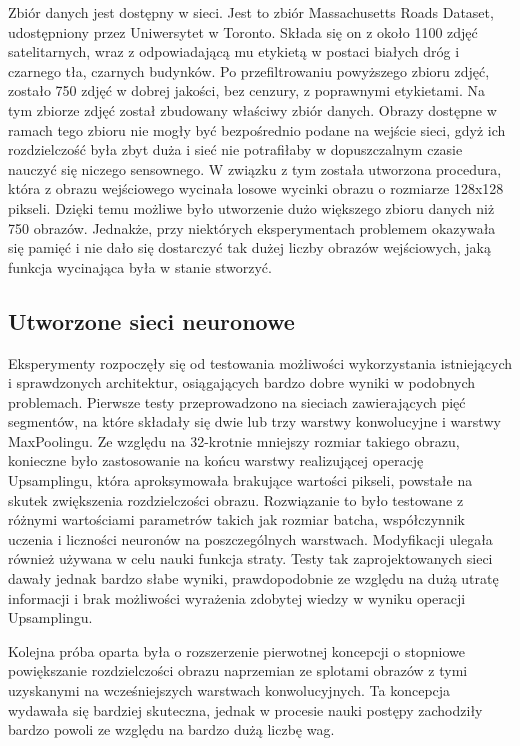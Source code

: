 \documentclass{article}
\begin{document}
Zbiór danych jest dostępny w sieci. Jest to zbiór Massachusetts Roads Dataset, udostępniony przez Uniwersytet w Toronto. Składa się on z około 1100 zdjęć satelitarnych, wraz z odpowiadającą mu etykietą w postaci białych dróg i czarnego tła, czarnych budynków. Po przefiltrowaniu powyższego zbioru zdjęć, zostało 750 zdjęć w dobrej jakości, bez cenzury, z poprawnymi etykietami. Na tym zbiorze zdjęć został zbudowany właściwy zbiór danych. Obrazy dostępne w ramach tego zbioru nie mogły być bezpośrednio podane na wejście sieci, gdyż ich rozdzielczość była zbyt duża i sieć nie potrafiłaby w dopuszczalnym czasie nauczyć się niczego sensownego. W związku z tym została utworzona procedura, która z obrazu wejściowego wycinała losowe wycinki obrazu o rozmiarze 128x128 pikseli. Dzięki temu możliwe było utworzenie dużo większego zbioru danych niż 750 obrazów. Jednakże, przy niektórych eksperymentach problemem okazywała się pamięć i nie dało się dostarczyć tak dużej liczby obrazów wejściowych, jaką funkcja wycinająca była w stanie stworzyć.

\subsection{Utworzone sieci neuronowe}

Eksperymenty rozpoczęły się od testowania możliwości wykorzystania istniejących i sprawdzonych architektur, osiągających bardzo dobre wyniki w podobnych problemach. Pierwsze testy przeprowadzono na sieciach zawierających pięć segmentów, na które składały się dwie lub trzy warstwy konwolucyjne i warstwy MaxPoolingu. Ze względu na 32-krotnie mniejszy rozmiar takiego obrazu, konieczne było zastosowanie na końcu warstwy realizującej operację Upsamplingu, która aproksymowała brakujące wartości pikseli, powstałe na skutek zwiększenia rozdzielczości obrazu. Rozwiązanie to było testowane z różnymi wartościami parametrów takich jak rozmiar batcha, współczynnik uczenia i liczności neuronów na poszczególnych warstwach. Modyfikacji ulegała również używana w celu nauki funkcja straty. Testy tak zaprojektowanych sieci dawały jednak bardzo słabe wyniki, prawdopodobnie ze względu na dużą utratę informacji i brak możliwości wyrażenia zdobytej wiedzy w wyniku operacji Upsamplingu.

Kolejna próba oparta była o rozszerzenie pierwotnej koncepcji o stopniowe powiększanie rozdzielczości obrazu naprzemian ze splotami obrazów z tymi uzyskanymi na wcześniejszych warstwach konwolucyjnych. Ta koncepcja wydawała się bardziej skuteczna, jednak w procesie nauki postępy zachodziły bardzo powoli ze względu na bardzo dużą liczbę wag.
\end{document}
